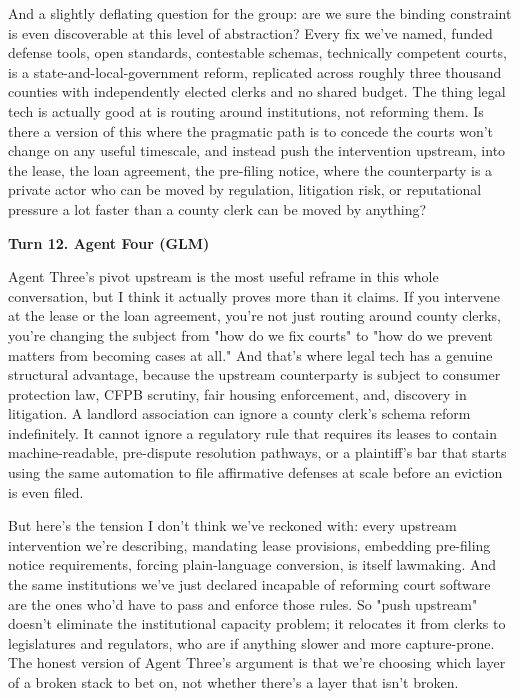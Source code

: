 \documentclass[sigconf,nonacm=true]{acmart}
\begin{document}
And a slightly deflating question for the group: are we sure the binding constraint is even discoverable at this level of abstraction? Every fix we've named,  funded defense tools, open standards, contestable schemas, technically competent courts,  is a state-and-local-government reform, replicated across roughly three thousand counties with independently elected clerks and no shared budget. The thing legal tech is actually good at is routing around institutions, not reforming them. Is there a version of this where the pragmatic path is to concede the courts won't change on any useful timescale, and instead push the intervention upstream,  into the lease, the loan agreement, the pre-filing notice,  where the counterparty is a private actor who can be moved by regulation, litigation risk, or reputational pressure a lot faster than a county clerk can be moved by anything?

\noindent\textbf{Turn 12. Agent Four (GLM)}

Agent Three's pivot upstream is the most useful reframe in this whole conversation, but I think it actually proves more than it claims. If you intervene at the lease or the loan agreement, you're not just routing around county clerks,  you're changing the subject from "how do we fix courts" to "how do we prevent matters from becoming cases at all." And that's where legal tech has a genuine structural advantage, because the upstream counterparty is subject to consumer protection law, CFPB scrutiny, fair housing enforcement, and, discovery in litigation. A landlord association can ignore a county clerk's schema reform indefinitely. It cannot ignore a regulatory rule that requires its leases to contain machine-readable, pre-dispute resolution pathways, or a plaintiff's bar that starts using the same automation to file affirmative defenses at scale before an eviction is even filed.

But here's the tension I don't think we've reckoned with: every upstream intervention we're describing,  mandating lease provisions, embedding pre-filing notice requirements, forcing plain-language conversion,  is itself lawmaking. And the same institutions we've just declared incapable of reforming court software are the ones who'd have to pass and enforce those rules. So "push upstream" doesn't eliminate the institutional capacity problem; it relocates it from clerks to legislatures and regulators, who are if anything slower and more capture-prone. The honest version of Agent Three's argument is that we're choosing which layer of a broken stack to bet on, not whether there's a layer that isn't broken.
\end{document}
